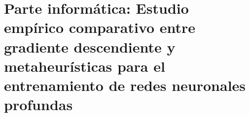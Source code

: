 ﻿\documentclass[a4paper,11pt]{article}
\begin{document}

\newpage




\part{Parte informática: Estudio empírico comparativo entre gradiente descendiente y metaheurísticas para el entrenamiento de redes neuronales profundas}

\vspace{4cm}

\newpage

%



\newpage
\thispagestyle{empty}
\mbox{}
\newpage

\newpage

\newpage



\newpage




\newpage












%
%
%
%
%
%
%
%
%
%
%
%
%
%
%
%
%

\newpage
\printbibliography


%
%
%
%
%
%
\end{document}
